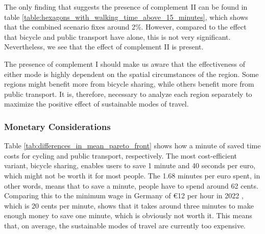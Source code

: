 The only finding that suggests the presence of complement II can be found in table \ref{table:hexagons_with_walking_time_above_15_minutes}, which shows that the combined scenario fixes around 2\%.
However, compared to the effect that bicycle and public transport have alone, this is not very significant.
Nevertheless, we see that the effect of complement II is present.


The presence of complement I should make us aware that the effectiveness of either mode is highly dependent on the spatial circumstances of the region.
Some regions might benefit more from bicycle sharing, while others benefit more from public transport.
It is, therefore, necessary to analyze each region separately to maximize the positive effect of sustainable modes of travel.



\subsubsection{Monetary Considerations}

Table \ref{tab:differences_in_mean_pareto_front} shows how a minute of saved time costs for cycling and public transport, respectively.
The most cost-efficient variant, bicycle sharing, enables users to save 1 minute and 40 seconds per euro, which might not be worth it for most people.
The 1.68 minutes per euro spent, in other words, means that to save a minute, people have to spend around 62 cents.
Comparing this to the minimum wage in Germany of \euro{12} per hour in 2022 , which is 20 cents per minute, shows that it takes around three minutes to make enough money to save one minute, which is obviously not worth it.
This means that, on average, the sustainable modes of travel are currently too expensive.

